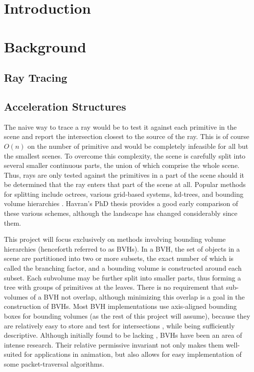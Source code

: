 \documentclass{article}
\begin{document}
\section{Introduction}
\section{Background}
\subsection{Ray Tracing}
\subsection{Acceleration Structures}
The naive way to trace a ray would be to test it against each primitive in the scene and report the intersection closest to the source of the ray.  This is of course $O(n)$ on the number of primitive and would be completely infeasible for all but the smallest scenes.   To overcome this complexity, the scene is carefully split into several smaller continuous parts, the union of which comprise the whole scene.  Thus, rays are only tested against the primitives in a part of the scene should it be determined that the ray enters that part of the scene at all.  Popular methods for splitting include octrees\cite{}, various grid-based systems\cite{}, kd-trees\cite{}, and bounding volume hierarchies \cite{}.  Havran's PhD thesis \cite{Havran00} provides a good early comparison of these various schemes, although the landscape has changed considerably since them.  

This project will focus exclusively on methods involving bounding volume hierarchies (henceforth referred to as BVHs).  In a BVH, the set of objects in a scene are partitioned into two or more subsets, the exact number of which is called the branching factor, and a bounding volume is constructed around each subset.  Each subvolume may be further split into smaller parts, thus forming a tree with groups of primitives at the leaves. There is no requirement that sub-volumes of a BVH not overlap, although minimizing this overlap is a goal in the construction of BVHs.  Most  BVH implementations use axis-aligned bounding boxes for bounding volumes (as the rest of this project will assume), because they are relatively easy to store and test for intersections \cite{}, while being sufficiently descriptive.  Although initially found to be lacking \cite{Havran00}, BVHs have been an area of intense research.  Their relative permissive invariant not only makes them well-suited for applications in animation, but also allows for easy implementation of some packet-traversal algorithms\cite{Wald07}.  
\end{document}
